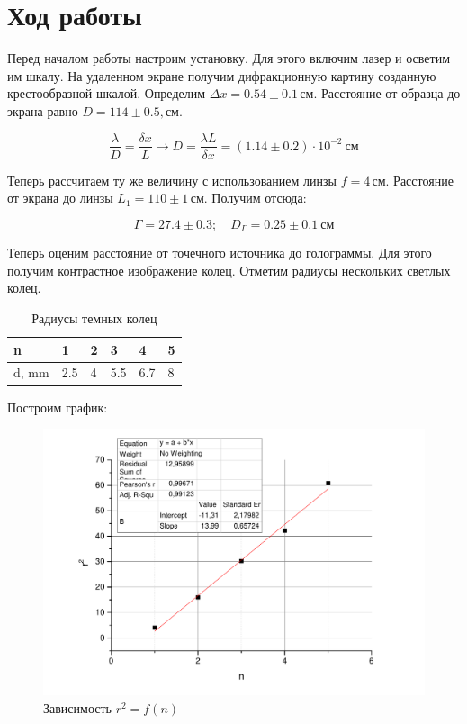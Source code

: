 \documentclass[a4paper,12pt]{article}
\begin{document}
	\section{Ход работы}
		Перед началом работы настроим установку. Для этого включим лазер и осветим им шкалу. На удаленном экране получим дифракционную картину созданную крестообразной шкалой. Определим $\Delta x = 0.54\pm0.1 \,\text{см}$. Расстояние от образца до экрана равно $D = 114\pm 0.5,\text{см}$.
		
		\begin{equation}
		\frac{\lambda}{D}=\frac{\delta x}{L}\rightarrow D=\frac{\lambda L}{\delta x}=(1.14\pm 0.2)\cdot 10^{-2} \ \mbox{см}
		\end{equation}
		
		Теперь рассчитаем ту же величину с использованием линзы $f = 4\,\text{см}$. Расстояние от экрана до линзы $L_1 = 110\pm 1\,\text{см}$. Получим отсюда:
		
		\begin{equation}
		\Gamma=27.4\pm 0.3; \quad D_{\Gamma}=0.25\pm 0.1 \ \mbox{см}
		\end{equation}
		
		
		Теперь оценим расстояние от точечного источника до голограммы. Для этого получим контрастное изображение колец. Отметим радиусы нескольких светлых колец.
		
		\begin{table}[h!]
			\centering
			\caption{Радиусы темных колец}
			\label{my-label}
			\begin{tabular}{|l|l|l|l|l|l|}
				\hline
				n & 1   & 2 & 3   & 4   & 5 \\ \hline
				d, mm & 2.5 & 4 & 5.5 & 6.7 & 8 \\ \hline
			\end{tabular}
		\end{table}
		
		\newpage
		
		Построим график:
		
		\begin{center}
			\begin{figure}[h]
				\centering
				\includegraphics[width=0.6\linewidth]{graph}
				\caption{Зависимость $r^2=f(n)$}
				\label{fig:Graph1}
			\end{figure}
		\end{center}
		
\end{document}
